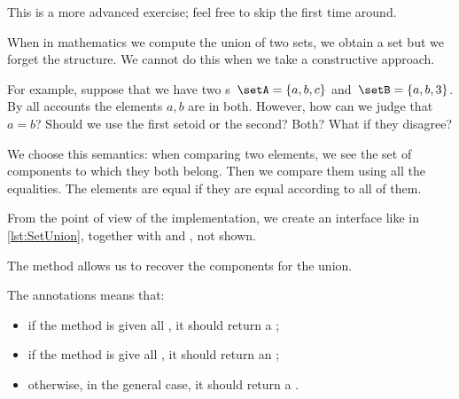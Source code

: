 \begin{remark}
    This is a more advanced exercise; feel free to skip the first time around.
\end{remark}

When in mathematics we compute the union of two sets, we obtain a set but we forget the structure.
We cannot do this when we take a constructive approach.

For example, suppose that we have two \Setoid{}s~$\setA = \{a,b,c\}$ and~$\setB = \{a,b,3\}$.
By all accounts the elements $a,b$ are in both.
However, how can we judge that~$a=b$?
Should we use the first setoid or the second?
Both?
What if they disagree?

We choose this semantics: when comparing two elements, we see the set of components to which they both belong.
Then we compare them using all the equalities.
The elements are equal if they are equal according to all of them.


From the point of view of the implementation, we create an interface like in \cref{lst:SetUnion}, together with \EnumerableSetUnion and \FiniteSetUnion, not shown.


The method  allows us to recover the components for the union.



\begin{widepar}
\end{widepar}



The  annotations means that:
\begin{itemize}
    \item if the method is given all \FiniteSet, it should return a \FiniteSet;
    \item if the method is give all \EnumerableSet, it should return an \EnumerableSet;
    \item otherwise, in the general case, it should return a \Setoid.
\end{itemize}

